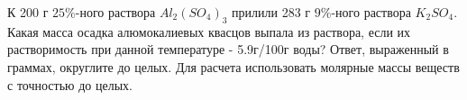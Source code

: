 
К 200 г $25\%$-ного раствора $Al_2(SO_4)_3$
прилили 283 г $9\%$-ного раствора $K_2SO_4$. Какая масса осадка
алюмокалиевых квасцов выпала из раствора, если их растворимость при данной
температуре - 5.9г/100г воды? Ответ, выраженный в граммах, округлите до целых.
Для расчета использовать молярные массы веществ с точностью до целых.



